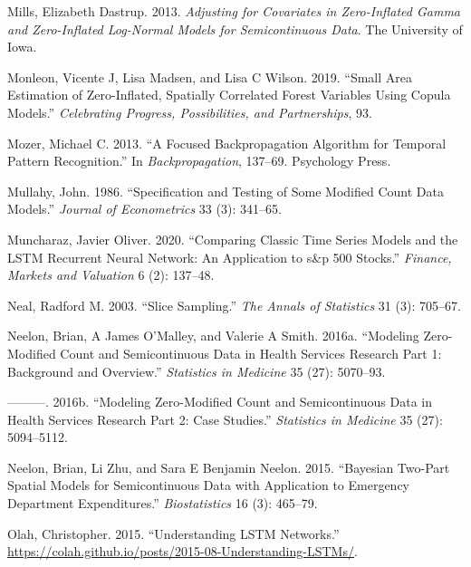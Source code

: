 \documentclass[
  letterpaper,
  double,
  12pt,
  1.0in]{beavtex}
\newlength{\cslhangindent}
\newenvironment{CSLReferences}[2] %
 {\begin{list}{}{%
  \setlength{\itemindent}{0pt}
  \setlength{\leftmargin}{0pt}
  \setlength{\parsep}{0pt}
  \ifodd #1
   \setlength{\leftmargin}{\cslhangindent}
   \setlength{\itemindent}{-1\cslhangindent}
  \fi
  \setlength{\itemsep}{#2\baselineskip}}}
 {\end{list}}
\begin{document}
\begin{CSLReferences}{1}{0}
Mills, Elizabeth Dastrup. 2013. \emph{Adjusting for Covariates in
Zero-Inflated Gamma and Zero-Inflated Log-Normal Models for
Semicontinuous Data}. The University of Iowa.

Monleon, Vicente J, Lisa Madsen, and Lisa C Wilson. 2019. {``Small Area
Estimation of Zero-Inflated, Spatially Correlated Forest Variables Using
Copula Models.''} \emph{Celebrating Progress, Possibilities, and
Partnerships}, 93.

Mozer, Michael C. 2013. {``A Focused Backpropagation Algorithm for
Temporal Pattern Recognition.''} In \emph{Backpropagation}, 137--69.
Psychology Press.

Mullahy, John. 1986. {``Specification and Testing of Some Modified Count
Data Models.''} \emph{Journal of Econometrics} 33 (3): 341--65.

Muncharaz, Javier Oliver. 2020. {``Comparing Classic Time Series Models
and the LSTM Recurrent Neural Network: An Application to s\&p 500
Stocks.''} \emph{Finance, Markets and Valuation} 6 (2): 137--48.

Neal, Radford M. 2003. {``Slice Sampling.''} \emph{The Annals of
Statistics} 31 (3): 705--67.

Neelon, Brian, A James O'Malley, and Valerie A Smith. 2016a. {``Modeling
Zero-Modified Count and Semicontinuous Data in Health Services Research
Part 1: Background and Overview.''} \emph{Statistics in Medicine} 35
(27): 5070--93.

---------. 2016b. {``Modeling Zero-Modified Count and Semicontinuous
Data in Health Services Research Part 2: Case Studies.''}
\emph{Statistics in Medicine} 35 (27): 5094--5112.

Neelon, Brian, Li Zhu, and Sara E Benjamin Neelon. 2015. {``Bayesian
Two-Part Spatial Models for Semicontinuous Data with Application to
Emergency Department Expenditures.''} \emph{Biostatistics} 16 (3):
465--79.

Olah, Christopher. 2015. {``Understanding LSTM Networks.''}
\url{https://colah.github.io/posts/2015-08-Understanding-LSTMs/}.


\end{CSLReferences}
\end{document}
